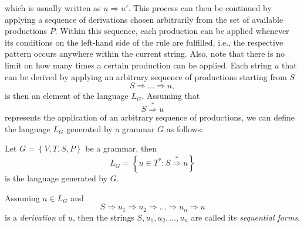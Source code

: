 which is usually written as $u \Rightarrow u'$.
This process can then be continued by applying a sequence of derivations chosen arbitrarily from the set of available productions $P$.
Within this sequence, each production can be applied whenever its conditions on the left-hand side of the rule are fulfilled, i.e., the respective pattern occurs anywhere within the current string.
Also, note that there is no limit on how many times a certain production can be applied.
Each string $u$ that can be derived by applying an arbitrary sequence of productions starting from $S$
\begin{equation*}
	S \Rightarrow \dots \Rightarrow u,
\end{equation*}
is then an element of the language $L_G$.
Assuming that 
\begin{equation*}
	S \overset{*}{\Rightarrow} u
\end{equation*}
represents the application of an arbitrary sequence of productions, we can define the language $L_G$ generated by a grammar $G$ as follows:
\begin{definition}[Language]\label{def:language}
	Let $G = \left\{V, T, S, P\right\}$ be a grammar, then
	\begin{equation}
		L_G = \left\{u \in T^* : S \overset{*}{\Rightarrow} u\right\}
	\end{equation}
is the language generated by $G$.
\end{definition}
Assuming $u \in L_G$ and 
\begin{equation}
	S \Rightarrow u_1 \Rightarrow u_2 \Rightarrow \dots \Rightarrow u_n \Rightarrow u
\end{equation}
is a \emph{derivation} of $u$, then the strings $S, u_1, u_2, \dots, u_n$ are called its \emph{sequential forms}.
